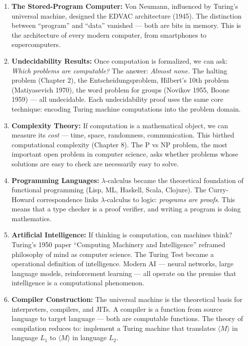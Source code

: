 \begin{enumerate}
\item \textbf{The Stored-Program Computer:} Von Neumann, influenced by Turing's universal machine, designed the EDVAC architecture (1945). The distinction between ``program'' and ``data'' vanished --- both are bits in memory. This is the architecture of every modern computer, from smartphones to supercomputers.

\item \textbf{Undecidability Results:} Once computation is formalized, we can ask: \emph{Which problems are computable?} The answer: \emph{Almost none.} The halting problem (Chapter 2), the Entscheidungsproblem, Hilbert's 10th problem (Matiyasevich 1970), the word problem for groups (Novikov 1955, Boone 1959) --- all undecidable. Each undecidability proof uses the same core technique: encoding Turing machine computations into the problem domain.

\item \textbf{Complexity Theory:} If computation is a mathematical object, we can measure its \emph{cost} --- time, space, randomness, communication. This birthed computational complexity (Chapter 8). The P vs NP problem, the most important open problem in computer science, asks whether problems whose solutions are easy to check are necessarily easy to solve.

\item \textbf{Programming Languages:} $\lambda$-calculus became the theoretical foundation of functional programming (Lisp, ML, Haskell, Scala, Clojure). The Curry-Howard correspondence links $\lambda$-calculus to logic: \emph{programs are proofs}. This means that a type checker is a proof verifier, and writing a program is doing mathematics.

\item \textbf{Artificial Intelligence:} If thinking is computation, can machines think? Turing's 1950 paper ``Computing Machinery and Intelligence'' reframed philosophy of mind as computer science. The Turing Test became a operational definition of intelligence. Modern AI --- neural networks, large language models, reinforcement learning --- all operate on the premise that intelligence is a computational phenomenon.

\item \textbf{Compiler Construction:} The universal machine is the theoretical basis for interpreters, compilers, and JITs. A compiler is a function from source language to target language --- both are computable functions. The theory of compilation reduces to: implement a Turing machine that translates $\langle M \rangle$ in language $L_1$ to $\langle M \rangle$ in language $L_2$.


\end{enumerate}

